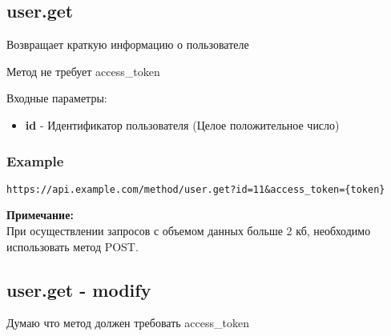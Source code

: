 
\subsection{user.get}
Возвращает краткую информацию о пользователе

Метод не требует access\_token


Входные параметры:
\begin{itemize}
  \item \textbf{id} - Идентификатор пользователя (Целое положительное число)
\end{itemize}

\subsubsection{Example}
\begin{Verbatim}[frame=single]
https://api.example.com/method/user.get?id=11&access_token={token}
\end{Verbatim}

\textbf{Примечание:} \\
При осуществлении запросов с объемом данных больше 2 кб, необходимо использовать метод POST.

\subsection{user.get - modify}
Думаю что метод должен требовать access\_token
